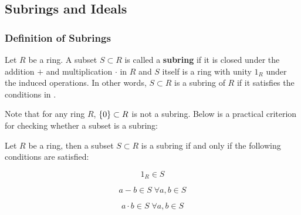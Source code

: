 \documentclass[a4paper,12pt]{article}
\begin{document}
\subsection{Subrings and Ideals}
\subsubsection{Definition of Subrings}
\begin{dft}
  Let $R$ be a ring. A subset $S\subset R$ is called a \textbf{subring} if it is closed under the addition $+$ and multiplication $\cdot$ in $R$ and $S$ itself is a ring with unity $1_{R}$ under the induced operations. In other words, $S\subset R$ is a subring of $R$ if it satisfies the conditions in \rdft[\sctd{32}].
\end{dft}\n

Note that for any ring $R$, $\left\{ 0\right\}\subset R$ is not a subring. Below is a practical criterion for checking whether a subset is a subring:\n

\begin{pst}
  Let $R$ be a ring, then a subset $S\subset R$ is a subring if and only if the following conditions are satisfied:

  \begin{alist}
    \item

    $$1_{R}\in S$$

    \item

    $$a-b\in S\;\forall a,b\in S$$

    \item

    $$a\cdot b\in S\;\forall a,b\in S$$
  \end{alist}
\end{pst}\n
\end{document}
